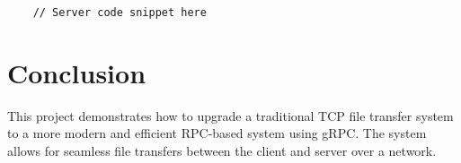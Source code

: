 \documentclass{article}
\begin{document}
\begin{verbatim}
    // Server code snippet here
\end{verbatim}

\section{Conclusion}
This project demonstrates how to upgrade a traditional TCP file transfer system to a more modern and efficient RPC-based system using gRPC. The system allows for seamless file transfers between the client and server over a network.
\end{document}
